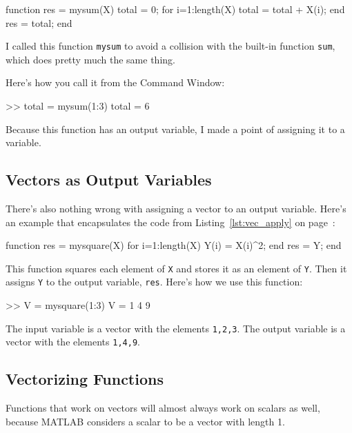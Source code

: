\documentclass[../../book.tex]{subfiles}
\begin{document}
\begin{code}
function res = mysum(X)
    total = 0;
    for i=1:length(X)
        total = total + X(i);
    end
    res = total;
end
\end{code}

I called this function \lstinline{mysum} to avoid a collision with the built-in
function \lstinline{sum}, which does pretty much the same thing.


Here's how you call it from the Command Window:

\begin{code}
>> total = mysum(1:3)
total = 6
\end{code}

Because this function has an output variable, I made a
point of assigning it to a variable.



\subsection{Vectors as Output Variables}

There's also nothing wrong with assigning a vector to an output
variable. Here's an example that encapsulates the code from
Listing~\ref{lst:vec_apply} on page~\pageref{lst:vec_apply}:

\begin{code}
function res = mysquare(X)
    for i=1:length(X)
        Y(i) = X(i)^2;
    end
    res = Y;
end
\end{code}

This function squares each element of \lstinline{X} and stores it as an element of \lstinline{Y}.  Then it assigns \lstinline{Y} to the output variable, \lstinline{res}.  Here's how we use this function:

\begin{code}
>> V = mysquare(1:3)
V = 1     4     9
\end{code}

The input variable is a vector with the elements \lstinline{1,2,3}.  The output variable is a vector with the elements \lstinline{1,4,9}.




\subsection{Vectorizing Functions}

Functions that work on vectors will almost always work on scalars
as well, because MATLAB considers a scalar to be a vector with
length 1.
\end{document}

